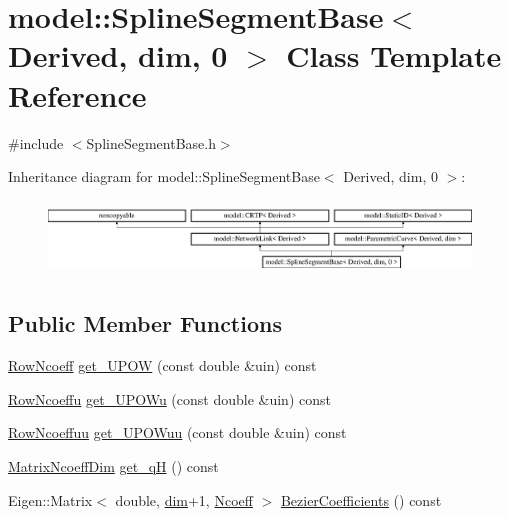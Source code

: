 \hypertarget{classmodel_1_1_spline_segment_base_3_01_derived_00_01dim_00_010_01_4}{}\section{model\+:\+:Spline\+Segment\+Base$<$ Derived, dim, 0 $>$ Class Template Reference}
\label{classmodel_1_1_spline_segment_base_3_01_derived_00_01dim_00_010_01_4}


{\ttfamily \#include $<$Spline\+Segment\+Base.\+h$>$}

Inheritance diagram for model\+:\+:Spline\+Segment\+Base$<$ Derived, dim, 0 $>$\+:\begin{figure}[H]
\begin{center}
\leavevmode
\includegraphics[height=1.978799cm]{classmodel_1_1_spline_segment_base_3_01_derived_00_01dim_00_010_01_4}
\end{center}
\end{figure}
\subsection*{Public Member Functions}
\begin{DoxyCompactItemize}
\item 
\hyperlink{_spline_enums_8h_a5a92526eb02d4d15fb803231f2cefe6d}{Row\+Ncoeff} \hyperlink{classmodel_1_1_spline_segment_base_3_01_derived_00_01dim_00_010_01_4_afeb64f6ceecb829d3b7cc0fe439a84a8}{get\+\_\+\+U\+P\+O\+W} (const double \&uin) const 
\item 
\hyperlink{_spline_enums_8h_a1d55d9eae696394fe669c29c2b10b48d}{Row\+Ncoeffu} \hyperlink{classmodel_1_1_spline_segment_base_3_01_derived_00_01dim_00_010_01_4_acfb2762f3c5f607a1f0c91c2550cdfdb}{get\+\_\+\+U\+P\+O\+Wu} (const double \&uin) const 
\item 
\hyperlink{_spline_enums_8h_a442d520d229fc9d7ccfcc1f21d289230}{Row\+Ncoeffuu} \hyperlink{classmodel_1_1_spline_segment_base_3_01_derived_00_01dim_00_010_01_4_a55acb5c6bc17c60a71894380a635854f}{get\+\_\+\+U\+P\+O\+Wuu} (const double \&uin) const 
\item 
\hyperlink{_spline_enums_8h_afafac8412b0453751e060d8170f20bec}{Matrix\+Ncoeff\+Dim} \hyperlink{classmodel_1_1_spline_segment_base_3_01_derived_00_01dim_00_010_01_4_ac7718dc804cd7a410d178b38aa72b68b}{get\+\_\+q\+H} () const 
\item 
Eigen\+::\+Matrix$<$ double, \hyperlink{plot_nd_a_8m_a382f3ca768b275b8d563604f7fc7df73}{dim}+1, \hyperlink{_spline_enums_8h_a7cc2e4244ca368f68e5746185eda6c4aa247e9ee4cf5980e4b82b85daddd8f437}{Ncoeff} $>$ \hyperlink{classmodel_1_1_spline_segment_base_3_01_derived_00_01dim_00_010_01_4_a05ac7b27c8a1901b9caf60363800a7b8}{Bezier\+Coefficients} () const 
\end{DoxyCompactItemize}

